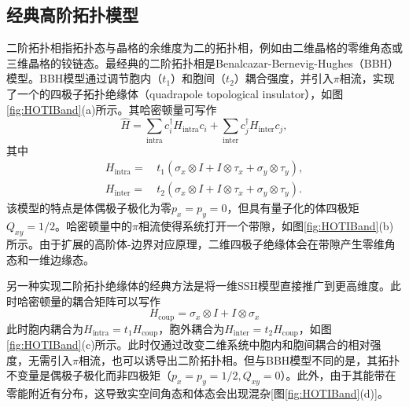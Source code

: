\subsection{经典高阶拓扑模型}
二阶拓扑相指拓扑态与晶格的余维度为二的拓扑相，例如由二维晶格的零维角态或三维晶格的铰链态。最经典的二阶拓扑相是Benalcazar-Bernevig-Hughes（BBH）模型\cite{benalcazar2017quantized}。BBH模型通过调节胞内（$t_1$）和胞间（$t_2$）耦合强度，并引入$\pi$相流，实现了一个的四极子拓扑绝缘体（quadrapole topological insulator），如图\ref{fig:HOTIBand}(a)所示。其哈密顿量可写作
\begin{equation}
\hat{H} = \sum_\text{intra} c_i^\dagger H_\text{intra} c_i + \sum_\text{inter} c_j^\dagger H_\text{inter} c_j,
\end{equation}
其中
\begin{equation}
\begin{aligned}
H_\text{intra} = & \, t_1 (\sigma_x \otimes I + I \otimes \tau_x + \sigma_y \otimes \tau_y), \\
H_\text{inter} = & \, t_2 (\sigma_x \otimes I + I \otimes \tau_x + \sigma_y \otimes \tau_y).
\end{aligned}
\end{equation}
该模型的特点是体偶极子极化为零$p_x=p_y=0$，但具有量子化的体四极矩$Q_{xy}=1/2$。哈密顿量中的$\pi$相流使得系统打开一个带隙，如图\ref{fig:HOTIBand}(b)所示。由于扩展的高阶体-边界对应原理，二维四极子绝缘体会在带隙产生零维角态和一维边缘态。

另一种实现二阶拓扑绝缘体的经典方法是将一维SSH模型直接推广到更高维度\cite{noh2018topological,ni2019observation,zhang2019second,xue2019acoustic,zhang2020low}。此时哈密顿量的耦合矩阵可以写作
\begin{equation}
H_{\text{coup}} = \sigma_x \otimes I + I \otimes \sigma_x
\end{equation}
此时胞内耦合为$H_\text{intra}=t_1H_{\text{coup}}$，胞外耦合为$H_\text{inter}=t_2H_{\text{coup}}$，如图\ref{fig:HOTIBand}(c)所示。此时仅通过改变二维系统中胞内和胞间耦合的相对强度，无需引入$\pi$相流，也可以诱导出二阶拓扑相。但与BBH模型不同的是，其拓扑不变量是偶极子极化而非四极矩（$p_x=p_y=1/2, Q_{xy}=0$）。此外，由于其能带在零能附近有分布，这导致实空间角态和体态会出现混杂[图\ref{fig:HOTIBand}(d)]。

